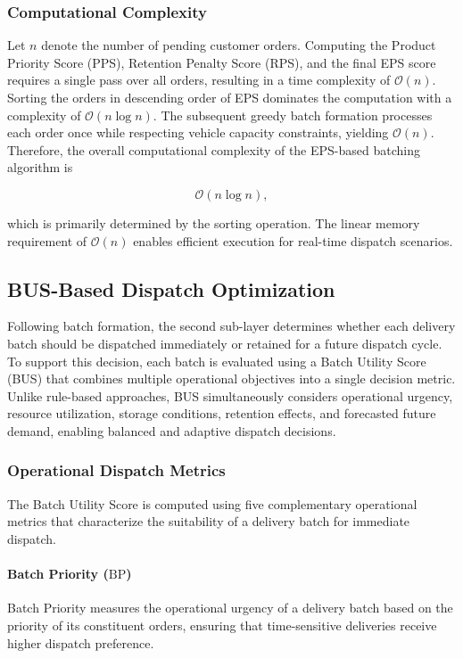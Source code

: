 \documentclass{article}
\begin{document}
\subsubsection{Computational Complexity}
Let $n$ denote the number of pending customer orders. Computing the Product Priority Score (PPS), Retention Penalty Score (RPS), and the final EPS score requires a single pass over all orders, resulting in a time complexity of $\mathcal{O}(n)$. Sorting the orders in descending order of EPS dominates the computation with a complexity of $\mathcal{O}(n \log n)$. The subsequent greedy batch formation processes each order once while respecting vehicle capacity constraints, yielding $\mathcal{O}(n)$. Therefore, the overall computational complexity of the EPS-based batching algorithm is

\begin{equation}
\mathcal{O}(n \log n),
\end{equation}

which is primarily determined by the sorting operation. The linear memory requirement of $\mathcal{O}(n)$ enables efficient execution for real-time dispatch scenarios.

\subsection{BUS-Based Dispatch Optimization}
\label{subsec:bus_dispatch_optimization}

Following batch formation, the second sub-layer determines whether each delivery batch should be dispatched immediately or retained for a future dispatch cycle. To support this decision, each batch is evaluated using a Batch Utility Score (BUS) that combines multiple operational objectives into a single decision metric. Unlike rule-based approaches, BUS simultaneously considers operational urgency, resource utilization, storage conditions, retention effects, and forecasted future demand, enabling balanced and adaptive dispatch decisions.

\subsubsection{Operational Dispatch Metrics}
\label{subsubsec:operational_dispatch_metrics}

The Batch Utility Score is computed using five complementary operational metrics that characterize the suitability of a delivery batch for immediate dispatch.

\paragraph{Batch Priority ($\mathrm{BP}$)}
Batch Priority measures the operational urgency of a delivery batch based on the priority of its constituent orders, ensuring that time-sensitive deliveries receive higher dispatch preference.
\end{document}

